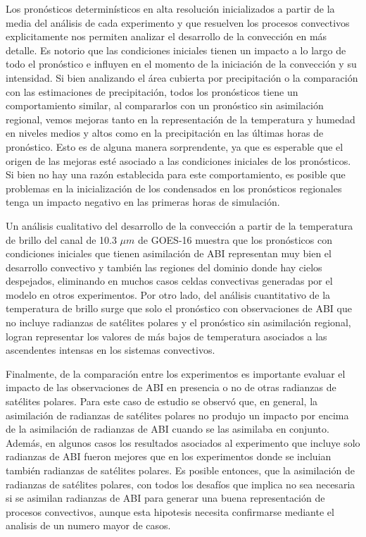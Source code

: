 \documentclass[12pt,oneside,a4paper]{reedthesis}
\begin{document}
Los pronósticos determinísticos en alta resolución inicializados a partir de la media del análisis de cada experimento y que resuelven los procesos convectivos explicitamente nos permiten analizar el desarrollo de la convección en más detalle. Es notorio que las condiciones iniciales tienen un impacto a lo largo de todo el pronóstico e influyen en el momento de la iniciación de la convección y su intensidad. Si bien analizando el área cubierta por precipitación o la comparación con las estimaciones de precipitación, todos los pronósticos tiene un comportamiento similar, al compararlos con un pronóstico sin asimilación regional, vemos mejoras tanto en la representación de la temperatura y humedad en niveles medios y altos como en la precipitación en las últimas horas de pronóstico. Esto es de alguna manera sorprendente, ya que es esperable que el origen de las mejoras esté asociado a las condiciones iniciales de los pronósticos. Si bien no hay una razón establecida para este comportamiento, es posible que problemas en la inicialización de los condensados en los pronósticos regionales tenga un impacto negativo en las primeras horas de simulación.

Un análisis cualitativo del desarrollo de la convección a partir de la temperatura de brillo del canal de 10.3 \(\mu m\) de GOES-16 muestra que los pronósticos con condiciones iniciales que tienen asimilación de ABI representan muy bien el desarrollo convectivo y también las regiones del dominio donde hay cielos despejados, eliminando en muchos casos celdas convectivas generadas por el modelo en otros experimentos. Por otro lado, del análisis cuantitativo de la temperatura de brillo surge que solo el pronóstico con observaciones de ABI que no incluye radianzas de satélites polares y el pronóstico sin asimilación regional, logran representar los valores de más bajos de temperatura asociados a las ascendentes intensas en los sistemas convectivos.

Finalmente, de la comparación entre los experimentos es importante evaluar el impacto de las observaciones de ABI en presencia o no de otras radianzas de satélites polares. Para este caso de estudio se observó que, en general, la asimilación de radianzas de satélites polares no produjo un impacto por encima de la asimilación de radianzas de ABI cuando se las asimilaba en conjunto. Además, en algunos casos los resultados asociados al experimento que incluye solo radianzas de ABI fueron mejores que en los experimentos donde se incluian también radianzas de satélites polares. Es posible entonces, que la asimilación de radianzas de satélites polares, con todos los desafíos que implica no sea necesaria si se asimilan radianzas de ABI para generar una buena representación de procesos convectivos, aunque esta hipotesis necesita confirmarse mediante el analisis de un numero mayor de casos.
\end{document}
